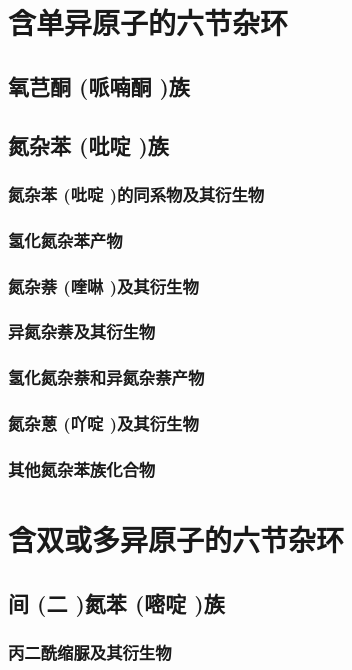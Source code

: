 \documentclass[UTF8]{../03-Chemistry}
\begin{document}
\section{含单异原子的六节杂环}
    \subsection{氧芑酮 (哌喃酮 )族}
    \subsection{氮杂苯 (吡啶 )族}
        \subsubsection{氮杂苯 (吡啶 )的同系物及其衍生物}
        \subsubsection{氢化氮杂苯产物}
        \subsubsection{氮杂萘 (喹啉 )及其衍生物}
        \subsubsection{异氮杂萘及其衍生物}
        \subsubsection{氢化氮杂萘和异氮杂萘产物}
        \subsubsection{氮杂蒽 (吖啶 )及其衍生物}
        \subsubsection{其他氮杂苯族化合物}
\section{含双或多异原子的六节杂环}
    \subsection{间 (二 )氮苯 (嘧啶 )族}
        \subsubsection{丙二酰缩脲及其衍生物}
\end{document}
